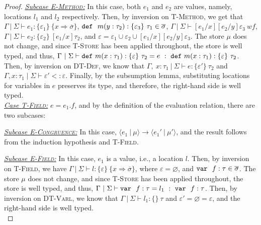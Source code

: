 \begin{proof}
\underline{\textit{Subcase \textsc{E-Method}:}} In this case, both $e_1$ and $e_2$ are values, namely, locations $l_1$ and $l_2$ respectively. Then, by inversion on \textsc{T-Method}, we get that \mbox{$\Gamma~|~\Sigma \vdash e_1 : \{ \varepsilon_1 \}~\{ x \Rightarrow \overline{\sigma} \}$},\linebreak
\mbox{$\mathtt{def}~~ m(y : \tau_2) : \{ \varepsilon_3 \}~\tau_1 \in \overline{\sigma}$}, $\Gamma~|~\Sigma \vdash [e_1/x][e_2/y]\varepsilon_3~\mathit{wf}$, $\Gamma~|~\Sigma \vdash e_2 : \{ \varepsilon_2 \}~[e_1/x]\tau_2$, and\linebreak
$\varepsilon = \varepsilon_1 \cup \varepsilon_2 \cup [e_1/x][e_2/y]\varepsilon_3$. The store $\mu$ does not change, and since \mbox{\textsc{T-Store}} has been applied throughout, the store is well typed, and thus,\linebreak
\mbox{$\Gamma~|~\Sigma \vdash \mathtt{def}~ m(x : \tau_1) : \{ \varepsilon \}~\tau_2 = e~:~\mathtt{def}~ m(x : \tau_1) : \{ \varepsilon \}~\tau_2$}. Then, by inversion on \mbox{\textsc{DT-Def}}, we know that \mbox{$\Gamma,~x : \tau_1~|~\Sigma \vdash e : \{ \varepsilon' \}~\tau_2$} and\linebreak
$\Gamma, x : \tau_1 \mid \Sigma \vdash \varepsilon' <: \varepsilon$. Finally, by the subsumption lemma, substituting locations for variables in $e$ preserves its type, and therefore, the right-hand side is well typed.
\\

\noindent\underline{\textit{Case \textsc{T-Field}:}}
$e = e_1.f$, and by the definition of the evaluation relation, there are two subcases:

\underline{\textit{Subcase \textsc{E-Congruence}:}} In this case, $\langle e_1~|~\mu \rangle \longrightarrow \langle e_1'~|~\mu' \rangle$, and the result follows from the induction hypothesis and \textsc{T-Field}.

\underline{\textit{Subcase \textsc{E-Field}:}} In this case, $e_1$ is a value, i.e., a location $l$. Then, by inversion on \mbox{\textsc{T-Field}}, we have $\Gamma~|~\Sigma \vdash l : \{ \varepsilon \}~\{ x \Rightarrow \overline{\sigma} \}$, where $\varepsilon = \varnothing$, and $\mathtt{var}~~ f : \tau \in \overline{\sigma}$. The store $\mu$ does not change, and since \textsc{T-Store} has been applied throughout, the store is well typed, and thus, \mbox{$\Gamma~|~\Sigma \vdash \mathtt{var}~~ f : \tau = l_1~:~\mathtt{var}~~ f : \tau$}. Then, by inversion on \textsc{DT-Varl}, we know that\linebreak
\mbox{$\Gamma~|~\Sigma \vdash l_1 : \{ \}~\tau$} and $\varepsilon' = \varnothing = \varepsilon$, and the right-hand side is well typed.
\\


\end{proof}
